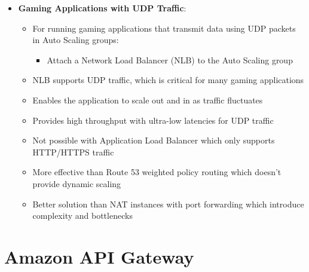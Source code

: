 \documentclass[11pt,a4paper]{report}
\begin{document}
\begin{itemize}
  \item \textbf{Gaming Applications with UDP Traffic}:
\begin{itemize}
  \item For running gaming applications that transmit data using UDP packets in Auto Scaling groups:
\begin{itemize}
  \item Attach a Network Load Balancer (NLB) to the Auto Scaling group
\end{itemize}
  \item NLB supports UDP traffic, which is critical for many gaming applications
  \item Enables the application to scale out and in as traffic fluctuates
  \item Provides high throughput with ultra-low latencies for UDP traffic
  \item Not possible with Application Load Balancer which only supports HTTP/HTTPS traffic
  \item More effective than Route 53 weighted policy routing which doesn't provide dynamic scaling
  \item Better solution than NAT instances with port forwarding which introduce complexity and bottlenecks
\end{itemize}
\end{itemize}


\section{Amazon API Gateway}
\end{document}
